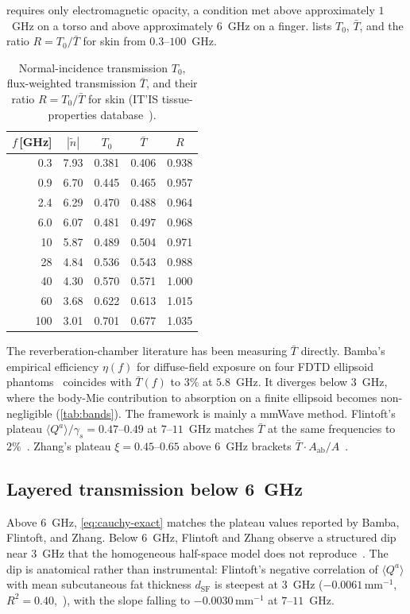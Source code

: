 \documentclass[journal,twocolumn,10pt]{IEEEtran}
\theoremstyle{plain}
\newcommand{\Aab}{A_{\mathrm{ab}}}
\newcommand{\Tbar}{\bar{T}}
\newcommand{\ntilde}{\tilde{n}}
\begin{document}
 requires only electromagnetic opacity, a
condition met above approximately $1$~GHz on a torso and above approximately $6$~GHz
on a finger.  lists $T_0$, $\Tbar$, and the ratio
$R = T_0/\Tbar$ for skin from $0.3$--$100$~GHz.

\begin{table}[!t]
\centering
\caption{Normal-incidence transmission $T_0$, flux-weighted
transmission $\Tbar$, and their ratio $R = T_0/\Tbar$ for skin
(IT'IS tissue-properties database~\cite{ITISv5,Gabriel1996}).}\label{tab:Tbar}
\begin{tabular}{rcccc}
\toprule
$f$\,[GHz] & $|\ntilde|$ & $T_0$ & $\Tbar$ & $R$ \\
\midrule
0.3 & 7.93 & 0.381 & 0.406 & 0.938 \\
0.9 & 6.70 & 0.445 & 0.465 & 0.957 \\
2.4 & 6.29 & 0.470 & 0.488 & 0.964 \\
6.0 & 6.07 & 0.481 & 0.497 & 0.968 \\
10  & 5.87 & 0.489 & 0.504 & 0.971 \\
28  & 4.84 & 0.536 & 0.543 & 0.988 \\
40  & 4.30 & 0.570 & 0.571 & 1.000 \\
60  & 3.68 & 0.622 & 0.613 & 1.015 \\
100 & 3.01 & 0.701 & 0.677 & 1.035 \\
\bottomrule
\end{tabular}
\end{table}

The reverberation-chamber literature has been measuring $\Tbar$
directly. Bamba's empirical efficiency $\eta(f)$ for diffuse-field
exposure on four FDTD ellipsoid phantoms~\cite{Bamba2014}
coincides with $\Tbar(f)$ to $3\%$ at $5.8$~GHz. It diverges below
$3$~GHz, where the body-Mie contribution to absorption on a finite
ellipsoid becomes non-negligible (\cref{tab:bands}). The framework
is mainly a mmWave method.
Flintoft's plateau $\langle Q^a\rangle/\gamma_s = 0.47$--$0.49$
at $7$--$11$~GHz matches $\Tbar$ at the same frequencies to $2\%$~\cite{Flintoft2014}.
Zhang's plateau $\xi = 0.45$--$0.65$ above $6$~GHz brackets
$\Tbar\cdot\Aab/A$~\cite{Zhang2017thesis}.


\subsection{Layered transmission below 6~GHz}\label{subsec:fp}


Above $6$~GHz, \eqref{eq:cauchy-exact} matches the plateau values
reported by Bamba, Flintoft, and Zhang. Below $6$~GHz, Flintoft and
Zhang observe a structured dip near $3$~GHz that the homogeneous
half-space model does not reproduce~\cite{Flintoft2014,Zhang2017thesis}. The
dip is anatomical rather than instrumental: Flintoft's negative
correlation of $\langle Q^a\rangle$ with mean subcutaneous fat
thickness $d_{\mathrm{SF}}$ is steepest at $3$~GHz
($-0.0061\,\mathrm{mm}^{-1}$, $R^2 = 0.40$,~\cite[Table~6]{Flintoft2014}),
with the slope falling to $-0.0030\,\mathrm{mm}^{-1}$ at $7$--$11$~GHz.
\end{document}
